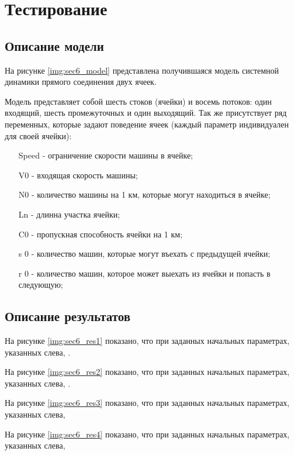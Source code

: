 \section{Тестирование}

\subsection{Описание модели}

На рисунке \ref{img:sec6_model} представлена получившаяся модель системной динамики прямого соединения двух ячеек.

Модель представляет собой шесть стоков (ячейки) и восемь потоков: один входящий, шесть промежуточных и один выходящий.
Так же присутствует ряд переменных, которые задают поведение ячеек (каждый параметр индивидуален для своей ячейки):
\begin{itemize}
    \item[Speed] - ограничение скорости машины в ячейке;
    \item[V0] - входящая скорость машины;
    \item[N0] - количество машины на 1 км, которые могут находиться в ячейке;
    \item[Ln] - длинна участка ячейки;
    \item[C0] - пропускная способность ячейки на 1 км;
    \item[s 0] - количество машин, которые могут въехать с предыдущей ячейки;
    \item[r 0] - количество машин, которое может выехать из ячейки и попасть в следующую;
\end{itemize}


\subsection{Описание результатов}

На рисунке \ref{img:sec6_res1} показано, что при заданных начальных параметрах, указанных слева, .


На рисунке \ref{img:sec6_res2} показано, что при заданных начальных параметрах, указанных слева, .


На рисунке \ref{img:sec6_res3} показано, что при заданных начальных параметрах, указанных слева, 


На рисунке \ref{img:sec6_res4} показано, что при заданных начальных параметрах, указанных слева, 


\clearpage